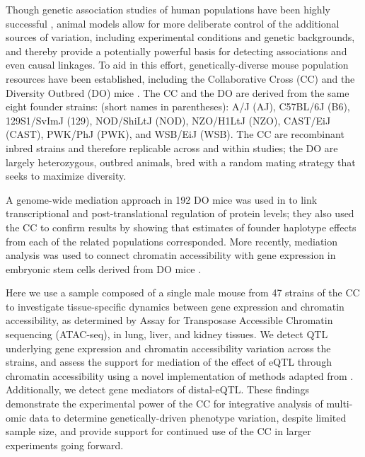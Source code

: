 \documentclass[9pt,twocolumn,twoside]{gsajnl}
\newcommand{\WV}[2]{\textcolor{red}{#1\footnote{\textcolor{red}{WV: #2}}}}
\begin{document}
Though genetic association studies of human populations have been highly successful \citep{Visscher2017}, animal models allow for more deliberate control of the additional sources of variation, including experimental conditions and genetic backgrounds, and thereby provide a potentially powerful basis for detecting associations and even causal linkages.
To aid in this effort, genetically-diverse mouse population resources have been established, including the Collaborative Cross (CC) \citep{Churchill2004,Hall2012,Srivastava2017} and the Diversity Outbred (DO) mice \citep{Churchill2012}. The CC and the DO are derived from the same eight founder strains: (short names in parentheses): A/J (AJ), C57BL/6J (B6), 129S1/SvImJ (129), NOD/ShiLtJ (NOD), NZO/H1LtJ (NZO), CAST/EiJ (CAST), PWK/PhJ (PWK), and WSB/EiJ (WSB). The CC are recombinant inbred strains and therefore replicable across and within studies; the DO are largely heterozygous, outbred animals, bred with a random mating strategy that seeks to maximize diversity. 

A genome-wide mediation approach in 192 DO mice was used in \citet{Chick2016} to link transcriptional and post-translational regulation of protein levels; they also used the CC to confirm results by showing that estimates of founder haplotype effects from each of the related populations corresponded. More recently, mediation analysis was used to connect chromatin accessibility with gene expression in embryonic stem cells derived from DO mice \citep{Skelly2019}.

Here we use a sample composed of a single male mouse from 47 strains of the CC to investigate tissue-specific dynamics between gene expression and  chromatin accessibility, as determined by Assay for Transposase Accessible Chromatin sequencing (ATAC-seq), in lung, liver, and kidney tissues. We detect QTL underlying gene expression and chromatin accessibility variation across the strains, and assess the support for mediation of the effect of eQTL through chromatin accessibility using a novel implementation of methods adapted from \cite{Chick2016}. Additionally, we detect gene mediators of distal-eQTL. 
These findings demonstrate the experimental power of the CC for integrative analysis of multi-omic data to determine genetically-driven phenotype variation, despite limited sample size, and provide support for continued use of the CC in larger experiments going forward.
\end{document}
